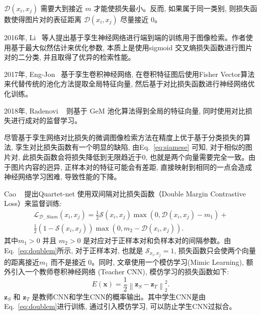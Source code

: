 $\mathcal{D}(x_i,x_j)$ 需要大到接近 $m$ 才能使损失最小。反而, 如果属于同一类别, 则损失函数使得图片对的表征距离 $\mathcal{D}(x_i, x_j)$ 尽量接近 0。\par
2016年, Li~\cite{li2015feature} 等人提出基于孪生神经网络进行端到端的训练用于图像检索。作者使用基于最大似然估计来优化参数, 本质上是使用sigmoid 交叉熵损失函数进行图片对的二分类, 并且取得了优异的检索性能。 \par
2017年, Eng-Jon~\cite{ong2017siamese} 基于孪生卷积神经网络, 在卷积特征图后使用Fisher Vector算法来代替传统的池化方法提取全局特征向量, 然后基于对比损失函数进行神经网络优化训练。\par
2018年, Radenovi ~\cite{radenovic2018fine} 则基于 GeM 池化算法得到全局的特征向量, 同时使用对比损失进行成对的监督学习。 \par
尽管基于孪生网络对比损失的微调图像检索方法在精度上优于基于分类损失的算法, 孪生对比损失函数有一个明显的缺陷, 由Eq.~\ref{eq:siamese} 可知, 对于相似的图片对, 此损失函数会将损失降低到无限趋近于0, 也就是两个向量需要完全一致。由于图片内容的迥异, 正样本对的特征可能会有差距, 直接映射到相同的一点会造成神经网络学习困难, 导致性能的下降。 \par
Cao ~\cite{cao2016quartet} 提出Quartet-net 使用双间隔对比损失函数（Double Margin Contrastive Loss）来监督训练:
\begin{equation}
    \begin{array}{r}
        \mathcal{L}_{\mathcal{D}_{-} S i a m}\left(x_i, x_j\right)=\frac{1}{2} \mathcal{S}\left(x_i, x_j\right) \max \left(0, \mathcal{D}\left(x_i, x_j\right)-m_1\right)+ \\
        \frac{1}{2}\left(1-\mathcal{S}\left(x_i, x_j\right)\right) \max \left(0, m_2-\mathcal{D}\left(x_i, x_j\right)\right).
        \end{array}
        \label{eq:doublem}
\end{equation}
其中$m_1 > 0$ 并且 $m_2 > 0$ 是对应对于正样本对和负样本对的间隔参数。由 Eq.~\ref{eq:doublem}所示, 对于正样本对, 也就是 $\mathcal{S}_{x_i, x_j} = 1$, 损失函数只会使两个向量的距离接近$m_1$ 而不是接近 $0$。同时, 文章使用一个模仿学习(Mimic Learning), 额外引入一个教师卷积神经网络 (Teacher CNN), 模仿学习的损失函数如下:
\begin{equation}
    E(\mathbf{x})=\frac{1}{2}\left\|\mathbf{z}_S-\mathbf{z}_T\right\|_2^2.
\end{equation}
$\mathbf{z}_S$ 和 $\mathbf{z}_{T}$ 是教师CNN和学生CNN的概率输出。其中学生CNN是由Eq.~\ref{eq:doublem}进行训练, 通过引入模仿学习, 可以防止学生CNN过拟合。 \par
